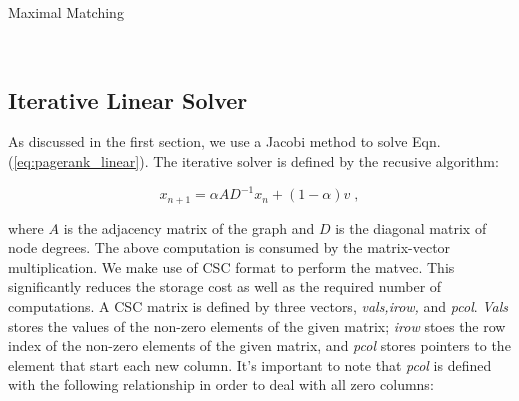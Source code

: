 \documentclass[11pt]{article}
\newcommand{\noi}{\noindent}
\begin{document}
	\begin{algorithm}[H]
        \small
	\caption{Maximal Matching}\label{alg:mxm}
	\begin{algorithmic}[1]
        \\
        
        \EndParFor

        \EndIf
        \EndParFor

        \EndFor
        
        \EndProcedure
        \end{algorithmic}
        \end{algorithm} 





\subsection{Iterative Linear Solver}

As discussed in the first section, we use a Jacobi method to solve Eqn.
(\ref{eq:pagerank_linear}). The iterative solver is defined by the recusive
algorithm:

\begin{equation*}
	x_{n+1} = \alpha AD^{-1}x_{n}+(1-\alpha)v \; , 
\end{equation*}

\noi where $A$ is the adjacency matrix of the graph and $D$ is the diagonal
matrix of node degrees. The above computation is consumed by the matrix-vector
multiplication. We make use of CSC format to perform the matvec. This
significantly reduces the storage cost as well as the required number of
computations. A CSC matrix is defined by three vectors, \textit{vals,irow,} and
\textit{pcol}. \textit{Vals} stores the values of the non-zero elements of the
given matrix; \textit{irow} stoes the row index of the non-zero elements of the
given matrix, and \textit{pcol} stores pointers to the element that start each
new column. It's important to note that \textit{pcol} is defined with the
following relationship in order to deal with all zero columns: 
\end{document}
